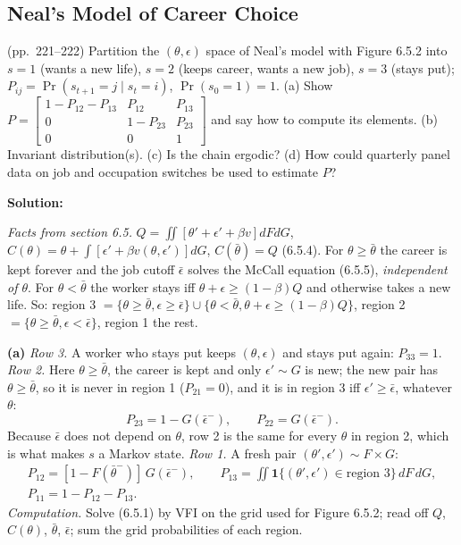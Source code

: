 \documentclass[12pt, letterpaper]{article}
\begin{document}
\subsection{Neal's Model of Career Choice}

\begin{tcolorbox}[evenbox,title={Exercise 6.26 \quad Neal Model's Markov Implications}]
\begin{tcolorbox}[questionbox]
(pp.~221--222) Partition the $(\theta,\epsilon)$ space of Neal's model with Figure 6.5.2 into $s=1$ (wants a new life), $s=2$
(keeps career, wants a new job), $s=3$ (stays put); $P_{ij}=\Pr(s_{t+1}=j\mid s_t=i)$, $\Pr(s_0=1)=1$. (a) Show
$P=\begin{bmatrix}1-P_{12}-P_{13}&P_{12}&P_{13}\\0&1-P_{23}&P_{23}\\0&0&1\end{bmatrix}$ and say how to compute its elements. (b)
Invariant distribution(s). (c) Is the chain ergodic? (d) How could quarterly panel data on job and
occupation switches be used to estimate $P$?
\end{tcolorbox}

\textbf{Solution:}

\emph{Facts from section 6.5.} $Q=\iint[\theta'+\epsilon'+\beta v]dFdG$, $C(\theta)=\theta+\int[\epsilon'+\beta v(\theta,\epsilon')]dG$,
$C(\bar\theta)=Q$ (6.5.4). For $\theta\ge\bar\theta$ the career is kept forever and the job cutoff $\bar\epsilon$ solves the
McCall equation (6.5.5), \emph{independent of $\theta$}. For $\theta<\bar\theta$ the worker stays iff $\theta+\epsilon\ge(1-\beta)Q$ and
otherwise takes a new life. So: region 3 $=\{\theta\ge\bar\theta,\epsilon\ge\bar\epsilon\}\cup\{\theta<\bar\theta,\theta+\epsilon\ge(1-\beta)Q\}$,
region 2 $=\{\theta\ge\bar\theta,\epsilon<\bar\epsilon\}$, region 1 the rest.

\textbf{(a)} \emph{Row 3.} A worker who stays put keeps $(\theta,\epsilon)$ and stays put again: $P_{33}=1$.
\emph{Row 2.} Here $\theta\ge\bar\theta$, the career is kept and only $\epsilon'\sim G$ is new; the new pair has
$\theta\ge\bar\theta$, so it is never in region 1 ($P_{21}=0$), and it is in region 3 iff $\epsilon'\ge\bar\epsilon$, whatever $\theta$:
\[
P_{23}=1-G(\bar\epsilon^-),\qquad P_{22}=G(\bar\epsilon^-).
\]
Because $\bar\epsilon$ does not depend on $\theta$, row 2 is the same for every $\theta$ in region 2, which is what makes
$s$ a Markov state. \emph{Row 1.} A fresh pair $(\theta',\epsilon')\sim F\times G$:
\[
\begin{gathered}P_{12}=[1-F(\bar\theta^-)]\,G(\bar\epsilon^-),\qquad P_{13}=\iint\mathbf 1\{(\theta',\epsilon')\in\text{region 3}\}\,dF\,dG,\\ P_{11}=1-P_{12}-P_{13}.\end{gathered}
\]
\emph{Computation.} Solve (6.5.1) by VFI on the grid used for Figure 6.5.2; read off $Q$, $C(\theta)$, $\bar\theta$,
$\bar\epsilon$; sum the grid probabilities of each region.


\end{tcolorbox}
\end{document}
